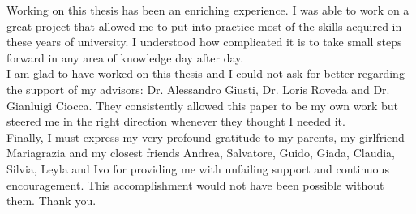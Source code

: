 
Working on this thesis has been an enriching experience. I was able to work on a great project that allowed me to put into practice most of the skills acquired in these years of university. I understood how complicated it is to take small steps forward in any area of knowledge day after day. \\

\noindent I am glad to have worked on this thesis and I could not ask for better regarding the support of my advisors: Dr. Alessandro Giusti, Dr. Loris Roveda and Dr. Gianluigi Ciocca. They consistently allowed this paper to be my own work but steered me in the right direction whenever they thought I needed it. \\

\noindent Finally, I must express my very profound gratitude to my parents, my girlfriend Mariagrazia and my closest friends Andrea, Salvatore, Guido, Giada, Claudia, Silvia, Leyla and Ivo for providing me with unfailing support and continuous encouragement. This accomplishment would not have been possible without them. Thank you.